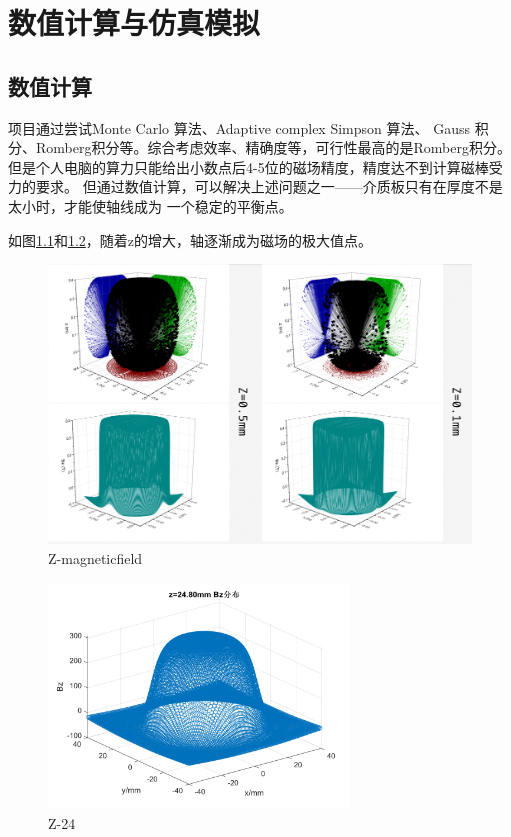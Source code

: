 \documentclass[AutoFakeBold]{LZUThesis}
\begin{document}
\chapter{数值计算与仿真模拟}
\section{数值计算}
项目通过尝试Monte Carlo 算法、Adaptive complex Simpson 算法、
Gauss 积分、Romberg积分等\cite{Numerical_Analysis}。综合考虑效率、精确度等，可行性最高的是Romberg积分。
但是个人电脑的算力只能给出小数点后4-5位的磁场精度，精度达不到计算磁棒受力的要求。
但通过数值计算，可以解决上述问题之一——介质板只有在厚度不是太小时，才能使轴线成为
一个稳定的平衡点。

如图\ref{zmag}和\ref{z24}，随着z的增大，轴逐渐成为磁场的极大值点。
\begin{figure}[H]
    \centering
    \includegraphics[width=12cm]{figures/Zmag.png}
    \caption{Z-magneticfield}
    \label{zmag}
\end{figure}

\begin{figure}[H]
    \centering
    \includegraphics[width=8cm]{figures/z24.png}
    \caption{Z-24}
    \label{z24}
\end{figure}
\end{document}
